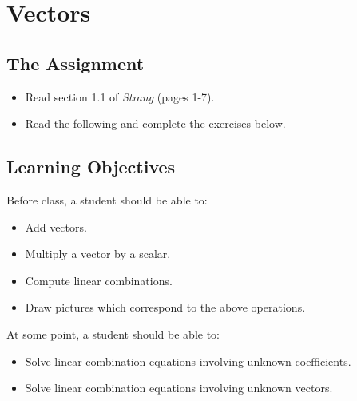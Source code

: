 \documentclass[10pt,]{book}
\theoremstyle{plain}
\theoremstyle{definition}
\numberwithin{equation}{section}
\begin{document}
\section[Vectors]{Vectors}\label{vectors}
\typeout{************************************************}
\typeout{************************************************}
\subsection[The Assignment]{The Assignment}\label{subsection-1}
\begin{itemize}
\item{}Read section 1.1 of \emph{Strang} (pages 1-7).\item{}Read the following and complete the exercises below.\end{itemize}
\typeout{************************************************}
\typeout{************************************************}
\subsection[Learning Objectives]{Learning Objectives}\label{subsection-2}
Before class, a student should be able to:
      \begin{itemize}
\item{}Add vectors.\item{}Multiply a vector by a scalar.\item{}Compute linear combinations.\item{}Draw pictures which correspond to the above operations.\end{itemize}

      At some point, a student should be able to:
      \begin{itemize}
\item{}Solve linear combination equations involving unknown coefficients.\item{}Solve linear combination equations involving unknown vectors.\end{itemize}

\typeout{************************************************}
\typeout{************************************************}
\end{document}
